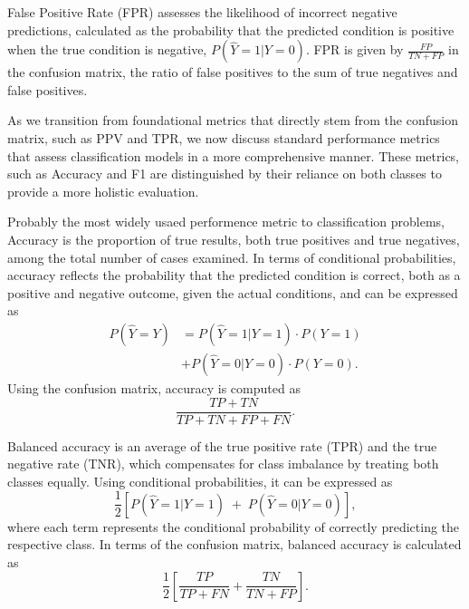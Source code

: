 \begin{definition}\label{def:fpr}
False Positive Rate (FPR) assesses the likelihood of incorrect negative predictions, calculated as the probability that the predicted condition is positive when the true condition is negative, $P(\hat{Y}=1|Y=0)$. FPR is given by $\frac{FP}{TN + FP}$ in the confusion matrix, the ratio of false positives to the sum of true negatives and false positives.
\end{definition}

As we transition from foundational metrics that directly stem from the confusion matrix, such as PPV and TPR, we now discuss standard performance metrics that assess classification models in a more comprehensive manner. These metrics, such as Accuracy and F1 are distinguished by their reliance on both classes to provide a more holistic evaluation.

\begin{definition}\label{def:acc}
Probably the most widely usaed performence metric to classification problems, Accuracy is the proportion of true results, both true positives and true negatives, among the total number of cases examined. In terms of conditional probabilities, accuracy reflects the probability that the predicted condition is correct, both as a positive and negative outcome, given the actual conditions, and can be 
expressed as 
\begin{align*}
    P(\hat{Y}=Y) &= P(\hat{Y}=1|Y=1) \cdot P(Y=1) \\
    &+ P(\hat{Y}=0|Y=0) \cdot P(Y=0).
\end{align*}
Using the confusion matrix, accuracy is computed as $$\frac{TP + TN}{TP + TN + FP + FN}.$$
\end{definition}
    
\begin{definition}\label{def:ba}
Balanced accuracy is an average of the true positive rate (TPR) and the true negative rate (TNR), which compensates for class imbalance by treating both classes equally. Using conditional probabilities, it can be expressed as $$\frac{1}{2}\left[ P(\hat{Y}=1|Y=1) \; + \; P(\hat{Y}=0|Y=0)\right],$$ where each term represents the conditional probability of correctly predicting the respective class. In terms of the confusion matrix, balanced accuracy is calculated as $$\frac{1}{2}\left[\frac{TP}{TP + FN} + \frac{TN}{TN + FP}\right].$$
\end{definition}
    
